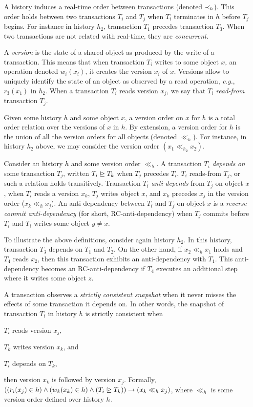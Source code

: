 A history induces a real-time order between transactions (denoted $\hb_h$).
This order holds between two transactions $T_i$ and $T_j$ when $T_i$ terminates in $h$ before $T_j$ begins.
For instance in history $h_2$, transaction $T_1$ precedes transaction $T_3$.
When two transactions are not related with real-time, they are \emph{concurrent}.

A \emph{version} is the state of a shared object as produced by the write of a transaction.
This means that when transaction $T_i$ writes to some object $x$, an operation denoted $w_i(x_i)$, it creates the version $x_i$ of $x$.
Versions allow to uniquely identify the state of an object as observed by a read operation, \emph{e.g.}, $r_3(x_1)$ in $h_2$.
When a transaction $T_i$ reads version $x_j$, we say that $T_i$ \emph{read-from} transaction $T_j$.

Given some history $h$ and some object $x$, a version order on $x$ for $h$ is a total order relation over the versions of $x$ in $h$.
By extension, a version order for $h$ is the union of all the version orders for all objects (denoted $\ll_h$).
For instance, in history $h_2$ above, we may consider the version order $(x_1 \ll_{h_2} x_2)$.

Consider an history $h$ and some version order $\ll_h$.
A transaction $T_i$ \emph{depends on} some transaction $T_j$, written $T_i \mathrel{\unrhd} T_k$ when $T_j$ precedes $T_i$, $T_i$ reads-from $T_j$, or such a relation holds transitively.
Transaction $T_i$ \emph{anti-depends} from $T_j$ on object $x$, when $T_i$ reads a version $x_k$, $T_j$ writes object $x$, and $x_k$ precedes $x_j$ in the version order ($x_k \ll_{h} x_j$).
An anti-dependency between $T_i$ and $T_j$ on object $x$ is a \emph{reverse-commit anti-dependency} (for short, RC-anti-dependency) \cite{hans16} when $T_j$ commits before $T_i$ and $T_i$ writes some object $y \neq x$.

To illustrate the above definitions, consider again history $h_2$.
In this history, transaction $T_3$ depends on $T_1$ and $T_2$.
On the other hand, if $x_2 \ll_h x_1$ holds and $T_4$ reads $x_2$, then this transaction exhibits an anti-dependency with $T_1$.
This anti-dependency becomes an RC-anti-dependency if $T_4$ executes an additional step where it writes some object $z$.

A transaction observes a \emph{strictly consistent snapshot} \cite{berstein?} when it never misses the effects of some transaction it depends on.
In other words, the snapshot of transaction $T_i$ in history $h$ is strictly consistent when
\begin{inparaenum}
\item $T_i$ reads version $x_j$,
\item $T_k$ writes version $x_k$, and 
\item $T_i$ depends on $T_{k}$,
\end{inparaenum}
then version $x_k$ is followed by version $x_j$.
Formally, $((r_i(x_j) \in h) \land (w_k(x_k) \in h) \land (T_i \depends T_k)) \implies (x_k \ll_h x_j)$, where $\ll_{h}$ is some version order defined over history $h$.

